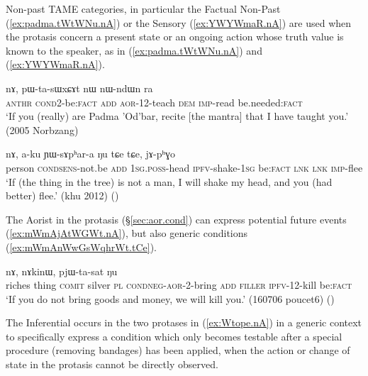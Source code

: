 Non-past TAME categories, in particular the Factual Non-Past (\ref{ex:padma.tWtWNu.nA}) or the Sensory (\ref{ex:YWYWmaR.nA}) are used when the protasis concern a present state or an ongoing action whose truth value is known to the speaker, as in (\ref{ex:padma.tWtWNu.nA}) and (\ref{ex:YWYWmaR.nA}).

\begin{exe}
\ex \label{ex:padma.tWtWNu.nA}
  nɤ, pɯ-ta-sɯxɕɤt nɯ nɯ-ndɯn ra \\
  \textsc{anthr} \textsc{cond}\redp{}2-be:\textsc{fact} \textsc{add} \textsc{aor}-1\fl{}2-teach \textsc{dem} \textsc{imp}-read be.needed:\textsc{fact} \\
 \glt `If you (really) are Padma 'Od'bar, recite [the mantra] that I have taught you.' (2005 Norbzang)
\end{exe}

\begin{exe}
\ex \label{ex:YWYWmaR.nA}
  nɤ, a-ku ɲɯ-sɤpʰar-a ŋu tɕe tɕe, jɤ-pʰɣo \\
 person \textsc{cond}\redp{}\textsc{sens}-not.be \textsc{add} \textsc{1sg}.\textsc{poss}-head \textsc{ipfv}-shake-\textsc{1sg} be:\textsc{fact} \textsc{lnk} \textsc{lnk} \textsc{imp}-flee \\
\glt `If (the thing in the tree) is not a man, I will shake my head, and you (had better) flee.' (khu 2012)
()
\end{exe}

The Aorist in the protasis (§\ref{sec:aor.cond}) can express potential future events  (\ref{ex:mWmAjAtWGWt.nA}), but also generic conditions (\ref{ex:mWmAnWwGsWqhrWt.tCe}).

\begin{exe}
\ex \label{ex:mWmAjAtWGWt.nA}
  nɤ, nɤkinɯ, pjɯ-ta-sat ŋu \\
 riches thing \textsc{comit} silver \textsc{pl} \textsc{cond}\redp{}\textsc{neg}-\textsc{aor}-2-bring \textsc{add} \textsc{filler} \textsc{ipfv}-1\fl{}2-kill be:\textsc{fact} \\
 \glt `If you do not bring goods and money, we will kill you.' (160706 poucet6)
()
 \end{exe}

The Inferential occurs in the two protases in (\ref{ex:Wtope.nA}) in a generic context to specifically express a condition which only becomes testable after a special procedure (removing bandages) has been applied, when the action or change of state in the protasis cannot be directly observed.

